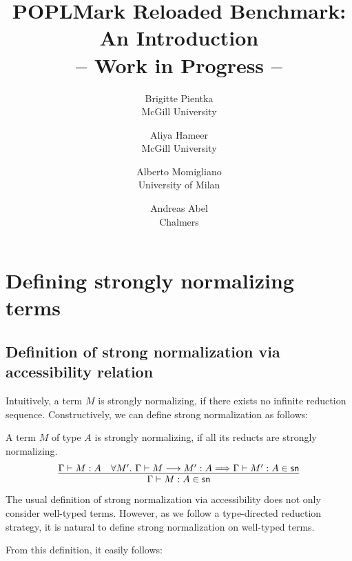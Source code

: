 \documentclass{article}
\newcommand{\csn}{\mathsf{sn}}
\newcommand{\red}{\longrightarrow}
\newcommand{\imply}{\Longrightarrow}
\begin{document}
\title{POPLMark Reloaded Benchmark: An Introduction \\
-- Work in Progress --}
\author{%
Brigitte Pientka \\ McGill University%
  \and Aliya Hameer \\ McGill University%
  \and Alberto Momigliano \\ University of Milan%
  \and Andreas Abel \\ Chalmers %
%
  }
\date{}
\maketitle



\section{Defining strongly normalizing terms}
\subsection{Definition of strong normalization via accessibility relation}
Intuitively, a term $M$ is strongly normalizing, if there exists no infinite reduction sequence. Constructively, we can define strong normalization as follows:

\begin{definition}\label{def:norm}
A term $M$ of type $A$ is strongly normalizing, if all its reducts are strongly
normalizing.\\
\[
\infer{\Gamma \vdash M : A \in \csn}
      {\Gamma \vdash M : A & \forall M'.~\Gamma \vdash M \red M' : A \imply \Gamma \vdash M' : A \in \csn}
\]
\end{definition}

The usual definition of strong normalization via accessibility does not only consider well-typed terms. However, as we follow a type-directed reduction strategy, it is natural to define strong normalization on well-typed terms.

From this definition, it easily follows:
\end{document}
